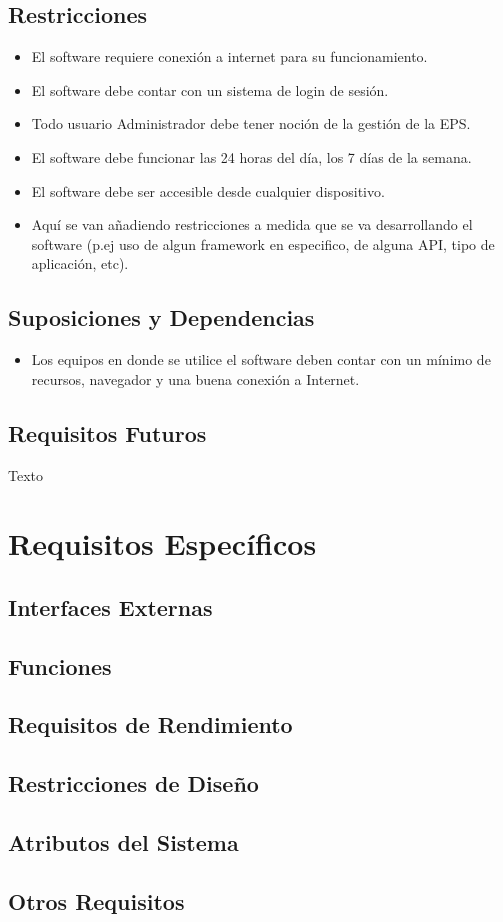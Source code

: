 \documentclass[12pt,a4paper]{article}
\begin{document}
\subsection{Restricciones}
\begin{itemize}
\item El software requiere conexión a internet para su funcionamiento.
\item El software debe contar con un sistema de login de sesión.
\item Todo usuario Administrador debe tener noción de la gestión de la EPS.
\item El software debe funcionar las 24 horas del día, los 7 días de la semana.
\item El software debe ser accesible desde cualquier dispositivo.
\item Aquí se van añadiendo restricciones a medida que se va desarrollando el software (p.ej uso de algun framework en especifico, de alguna API, tipo de aplicación, etc).
\end{itemize}
\subsection{Suposiciones y Dependencias}
\begin{itemize}
\item Los equipos en donde se utilice el software deben contar con un mínimo de recursos, navegador y una buena conexión a Internet.
\end{itemize}
\subsection{Requisitos Futuros}
Texto
\section{Requisitos Específicos}
\subsection{Interfaces Externas}
\subsection{Funciones}
\subsection{Requisitos de Rendimiento}
\subsection{Restricciones de Diseño}
\subsection{Atributos del Sistema}
\subsection{Otros Requisitos}
\end{document}
